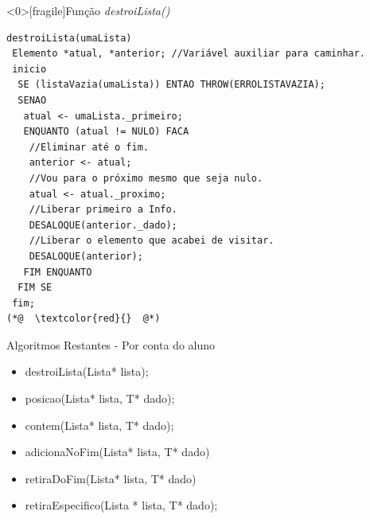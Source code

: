 \documentclass[12pt,table,xcolor={dvipsnames}]{beamer}
\begin{document}
\begin{frame}<0>[fragile]{Função \textit{destroiLista()}}
\begin{lstlisting}
destroiLista(umaLista)
 Elemento *atual, *anterior; //Variável auxiliar para caminhar.
 inicio
  SE (listaVazia(umaLista)) ENTAO THROW(ERROLISTAVAZIA);
  SENAO
   atual <- umaLista._primeiro;    
   ENQUANTO (atual != NULO) FACA 
    //Eliminar até o fim.
    anterior <- atual;
    //Vou para o próximo mesmo que seja nulo.
    atual <- atual._proximo;
    //Liberar primeiro a Info.
    DESALOQUE(anterior._dado);
    //Liberar o elemento que acabei de visitar.
    DESALOQUE(anterior);
   FIM ENQUANTO
  FIM SE
 fim;
(*@  \textcolor{red}{}  @*)
\end{lstlisting}
\end{frame}


\begin{frame}[fragile]{Algoritmos Restantes - Por conta do aluno}
	\begin{itemize}
		\item destroiLista(Lista* lista);
		\item posicao(Lista* lista, T* dado);
		\item contem(Lista* lista, T* dado);

		\item adicionaNoFim(Lista* lista, T* dado)

		\item retiraDoFim(Lista* lista, T* dado)
		\item retiraEspecifico(Lista * lista, T* dado);
	\end{itemize}
\end{frame}
\end{document}
